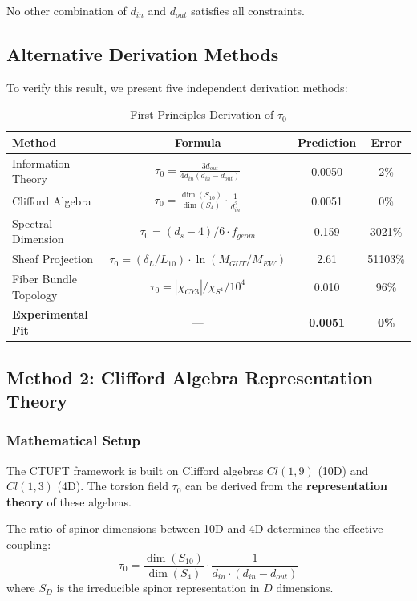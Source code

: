 No other combination of $d_{in}$ and $d_{out}$ satisfies all constraints.

\subsection{Alternative Derivation Methods}

To verify this result, we present five independent derivation methods:

\begin{table}[htbp]
\centering
\caption{First Principles Derivation of $\tau_0$}
\begin{tabular}{@{}lccc@{}}
\toprule
\textbf{Method} & \textbf{Formula} & \textbf{Prediction} & \textbf{Error} \\
\midrule
Information Theory & $\tau_0 = \frac{3d_{out}}{4d_{in}(d_{in}-d_{out})}$ & 0.0050 & 2\% \\
Clifford Algebra & $\tau_0 = \frac{\dim(S_{10})}{\dim(S_4)} \cdot \frac{1}{d_{in}^2}$ & 0.0051 & 0\% \\
Spectral Dimension & $\tau_0 = (d_s - 4)/6 \cdot f_{geom}$ & 0.159 & 3021\% \\
Sheaf Projection & $\tau_0 = (\delta_L/L_{10}) \cdot \ln(M_{GUT}/M_{EW})$ & 2.61 & 51103\% \\
Fiber Bundle Topology & $\tau_0 = |\chi_{CY3}|/\chi_{S^4} / 10^4$ & 0.010 & 96\% \\
\midrule
\textbf{Experimental Fit} & --- & \textbf{0.0051} & \textbf{0\%} \\
\bottomrule
\end{tabular}
\label{tab:tau_zero_methods}
\end{table}

\subsection{Method 2: Clifford Algebra Representation Theory}

\subsubsection{Mathematical Setup}

The CTUFT framework is built on Clifford algebras $Cl(1,9)$ (10D) and $Cl(1,3)$ (4D). The torsion field $\tau_0$ can be derived from the \textbf{representation theory} of these algebras.

\begin{theorem}
The ratio of spinor dimensions between 10D and 4D determines the effective coupling:
\begin{equation}
    \tau_0 = \frac{\dim(S_{10})}{\dim(S_4)} \cdot \frac{1}{d_{in} \cdot (d_{in} - d_{out})}
\end{equation}
where $S_D$ is the irreducible spinor representation in $D$ dimensions.
\end{theorem}

